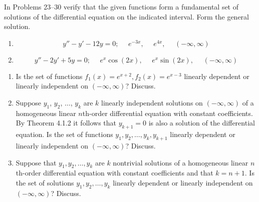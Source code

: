 \documentclass[12pt]{report}
\newcommand{\ivpsep}{\mbox{{ }{ }}}
\begin{document}

In Problems 23--30 verify that the given functions form a fundamental set of solutions of the differential equation on the indicated interval. Form the general solution.

\begin{enumerate}[label=\arabic*.,start=23]
    \item \[ y'' - y' - 12y = 0;\ivpsep e^{-3x},\ivpsep e^{4x},\ivpsep (-\infty, \infty) \]					%
	\setcounter{enumi}{24}
	\item \[ y'' - 2y' + 5y = 0;\ivpsep e^{x}\cos(2x), \ivpsep e^{x}\sin(2x),\ivpsep (-\infty, \infty) \]	%
\end{enumerate}

\begin{enumerate}[label=\arabic*.,start=40]
    \item Is the set of functions $f_{1}(x) = e^{x+2}, f_{2}(x) = e^{x-3}$ linearly dependent or linearly independent on $(-\infty, \infty)$? Discuss. %
	\item Suppose $y_{1}$, $y_{2}$, $\dots$, $y_{k}$ are $k$ linearly independent solutions on $(-\infty, \infty)$ of a homogeneous linear $n$th-order differential equation with constant coefficients. By Theorem 4.1.2 it follows that $y_{k+1}=0$ is also a solution of the differential equation. Is the set of functions $y_{1}, y_{2}, \dots, y_{k}, y_{k+1}$ linearly dependent or linearly independent on $(-\infty, \infty)$? Discuss. %
	\item Suppose that $y_{1}, y_{2}, \dots, y_{k}$ are $k$ nontrivial solutions of a homogeneous linear $n$th-order differential equation with constant coefficients and that $k=n+1$. Is the set of solutions $y_{1}, y_{2}, \dots, y_{k}$ linearly dependent or linearly independent on $(-\infty, \infty)$? Discuss. %
\end{enumerate}
\end{document}

